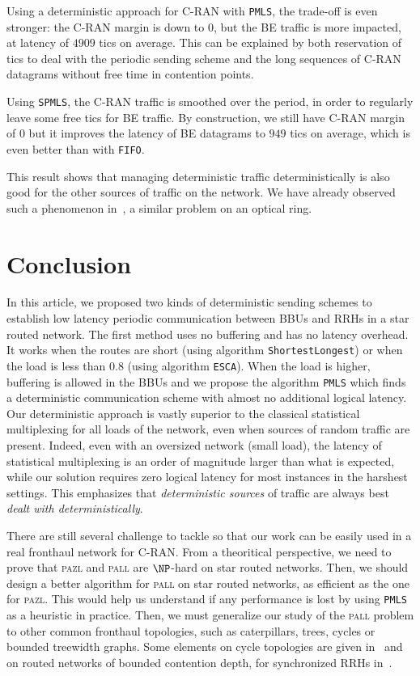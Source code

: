 \documentclass[a4paper,10pt]{journal}
\newcommand\shortestlongest{\texttt{ShortestLongest}\xspace}
\newcommand\ESCA{\texttt{ESCA}\xspace}
\newcommand\PMLS{\texttt{PMLS}\xspace}
\newcommand\SPMLS{\texttt{SPMLS}\xspace}
\newcommand\FIFO{\texttt{FIFO}\xspace}
\newcommand\pazl{\textsc{pazl}\xspace}
\newcommand\pall{\textsc{pall}\xspace}
\begin{document}
     Using a deterministic approach for C-RAN with \PMLS, the trade-off is even stronger:
      the C-RAN margin is down to $0$, but the BE traffic is more impacted, at latency of $4909$ tics on average. This can be explained by both reservation of tics to deal with the periodic sending scheme and the long sequences of C-RAN datagrams without free time in contention points.
     
     Using \SPMLS, the C-RAN traffic is smoothed over the period, in order to regularly leave some free tics for BE traffic. By construction, we still have C-RAN margin of $0$ but it improves the latency of 
     BE datagrams to $949$ tics on average, which is even better than with \FIFO. 
     
      This result shows that managing deterministic traffic deterministically is also good for the other sources of traffic on the network. We have already observed such a phenomenon in~\cite{DBLP:conf/ondm/BarthGS19}, a similar 
     problem on an optical ring.
     


 \section{Conclusion}
 
	In this article, we proposed two kinds of deterministic sending schemes to establish low latency periodic communication between BBUs and RRHs in a star routed network. The first method uses no buffering and has no latency overhead. It works when the routes are short (using algorithm \shortestlongest) or when the load is less than $0.8$ (using algorithm \ESCA).  
	When the load is higher, buffering is allowed in the BBUs and we propose the algorithm \PMLS which finds a deterministic communication scheme with almost no additional logical latency.
 	Our deterministic approach is vastly superior to the classical statistical multiplexing for all loads of the network, even when sources of random traffic are present. Indeed, even with an oversized network (small load), the latency of statistical multiplexing is an order of magnitude larger than what is expected, while our solution requires zero logical latency for most instances in the harshest settings. This emphasizes that \emph{deterministic sources} of traffic are always best \emph{dealt with deterministically}.  
    
 	There are still several challenge to tackle so that our work can be easily used in a real 
 	fronthaul network for C-RAN.
  	From a theoritical perspective, we need to prove that \pazl and \pall are $\NP$-hard on star routed networks. Then, we should design a better \FPT algorithm for \pall on star routed networks, as efficient as the one for \pazl. This would help us understand if any performance is lost by using \PMLS as a heuristic in practice. Then, we must generalize our study of the \pall problem to other common fronthaul topologies, such as caterpillars, trees, cycles or bounded treewidth graphs. Some elements on cycle topologies are given in~\cite{DBLP:conf/ondm/BarthGS19} and on routed networks of bounded contention depth, for synchronized RRHs in~\cite{guiraud2020synchronized}.
\end{document}
